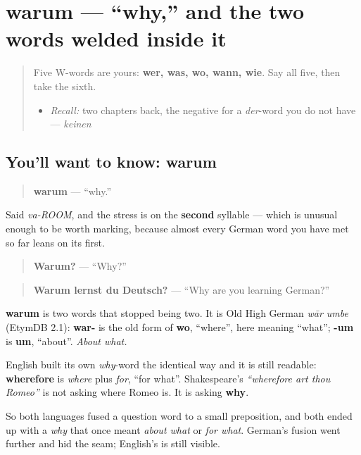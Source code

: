 \section[warum]{warum — \textquotedblleft{}why,\textquotedblright{} and the two words welded inside it}

\label{lesson:GE-C33-warum}



\begin{quote}
Five W-words are yours: \textbf{wer, was, wo, wann, wie}. Say all five, then take the sixth.

\begin{itemize}
\raggedright
  \item \emph{Recall:} two chapters back, the negative for a \emph{der}-word you do not have — \emph{keinen}
\end{itemize}
\end{quote}

\subsection*{You'll want to know: warum}
\begin{quote}
\textbf{warum} — \textquotedblleft{}why.\textquotedblright{}
\end{quote}

Said \emph{va-ROOM}, and the stress is on the \textbf{second} syllable — which is unusual enough to be worth marking, because almost every German word you have met so far leans on its first.

\begin{quote}
\textbf{Warum?} — \textquotedblleft{}Why?\textquotedblright{}
\end{quote}

\begin{quote}
\textbf{Warum lernst du Deutsch?} — \textquotedblleft{}Why are you learning German?\textquotedblright{}
\end{quote}

\begin{cousinweb}
\textbf{warum} is two words that stopped being two. It is Old High German \emph{wār umbe} (EtymDB 2.1): \textbf{war-} is the old form of \textbf{wo}, \textquotedblleft{}where\textquotedblright{}, here meaning \textquotedblleft{}what\textquotedblright{}; \textbf{-um} is \textbf{um}, \textquotedblleft{}about\textquotedblright{}. \emph{About what.}

English built its own \emph{why}-word the identical way and it is still readable: \textbf{wherefore} is \emph{where} plus \emph{for}, \textquotedblleft{}for what\textquotedblright{}. Shakespeare's \emph{\textquotedblleft{}wherefore art thou Romeo\textquotedblright{}} is not asking where Romeo is. It is asking \textbf{why}.

So both languages fused a question word to a small preposition, and both ended up with a \emph{why} that once meant \emph{about what} or \emph{for what}. German's fusion went further and hid the seam; English's is still visible.
\end{cousinweb}

